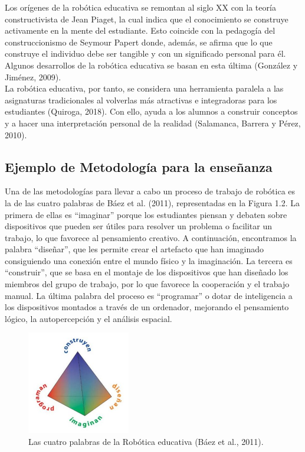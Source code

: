 \documentclass{report}
\begin{document}
Los orígenes de la robótica educativa se remontan al siglo XX con la teoría constructivista de Jean Piaget, la cual indica que el conocimiento se construye activamente en la mente del estudiante. Esto coincide con la pedagogía del construccionismo de Seymour Papert donde, además, se afirma que lo que construye el individuo debe ser tangible y con un significado personal para él. Algunos desarrollos de la robótica educativa se basan en esta última (González y Jiménez, 2009).
\\

La robótica educativa, por tanto, se considera una herramienta paralela a las asignaturas tradicionales al volverlas más atractivas e integradoras para los estudiantes (Quiroga, 2018). Con ello, ayuda a los alumnos a construir conceptos y a hacer una interpretación personal de la realidad (Salamanca, Barrera y Pérez, 2010).
\\

\subsection{Ejemplo de Metodología para la enseñanza}

Una de las metodologías para llevar a cabo un proceso de trabajo de robótica es la de las cuatro palabras de Báez et al. (2011), representadas en la Figura 1.2. La primera de ellas es “imaginar” porque los estudiantes piensan y debaten sobre dispositivos que pueden ser útiles para resolver un problema o facilitar un trabajo, lo que favorece al pensamiento creativo. A continuación, encontramos la palabra “diseñar”, que les permite crear el artefacto que han imaginado consiguiendo una conexión entre el mundo físico y la imaginación. La tercera es “construir”, que se basa en el montaje de los dispositivos que han diseñado los miembros del grupo de trabajo, por lo que favorece la cooperación y el trabajo manual. La última palabra del proceso es “programar” o dotar de inteligencia a los dispositivos montados a través de un ordenador, mejorando el pensamiento lógico, la autopercepción y el análisis espacial.
\\
\begin{figure}[h!]
  \centering
    \includegraphics[width=0.4\textwidth]{images/metodologia.png}
  \caption{Las cuatro palabras de la Robótica educativa (Báez et al., 2011).}
  \label{Metodologia}
\end{figure}
\\
\end{document}
